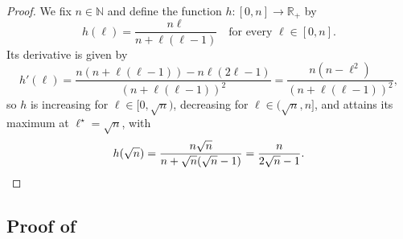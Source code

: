 \documentclass[11pt]{article}
\newcommand{\N}{\mathbb{N}}
\newcommand{\R}{\mathbb{R}}
\begin{document}
\propAlphaStar*

\begin{proof}
We fix $n\in \N$ and define the function $h\colon [0,n]\to \R_+$ by 
    \[
        h(\ell) = \frac{n\ell}{n+\ell(\ell-1)}\quad \text{for every } \ell\in [0,n].
    \]
    Its derivative is given by 
    \[
         h'(\ell) = \frac{n(n+\ell(\ell-1)) - n\ell(2\ell-1)}{(n+\ell(\ell-1))^2} = \frac{n(n-\ell^2)}{(n+\ell(\ell-1))^2},
    \]
    so $h$ is increasing for $\ell\in [0,\sqrt{n})$, decreasing for $\ell\in (\sqrt{n},n]$, and attains its maximum at $\ell^\star=\sqrt{n}$, with
    \[
        h(\sqrt{n}) = \frac{n\sqrt{n}}{n+\sqrt{n}(\sqrt{n}-1)} = \frac{n}{2\sqrt{n}-1}.\qedhere
    \]
\end{proof}

\subsection{Proof of }\label{app:thmmbound}
\end{document}
